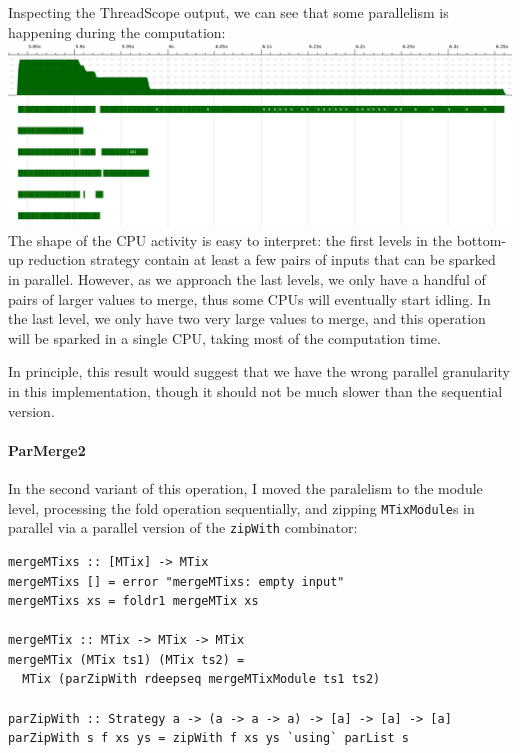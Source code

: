 \documentclass[a4paper,10pt]{article}
\begin{document}
Inspecting the ThreadScope output, we can see that some parallelism is happening
during the computation:\\

\includegraphics[scale=0.3]{threadscope/ParMerge1}\\

The shape of the CPU activity is easy to interpret: the first levels in the
bottom-up reduction strategy contain at least a few pairs of inputs that can be
sparked in parallel.
%
However, as we approach the last levels, we only have a handful of pairs of
larger values to merge, thus some CPUs will eventually start idling.
%
In the last level, we only have two very large values to merge, and this
operation will be sparked in a single CPU, taking most of the computation time.

In principle, this result would suggest that we have the wrong parallel
granularity in this implementation, though it should not be much slower than
the sequential version.

\paragraph{ParMerge2}

In the second variant of this operation, I moved the paralelism to the module
level, processing the fold operation sequentially, and zipping
\texttt{MTixModule}s in parallel via a parallel version of the \texttt{zipWith}
combinator:

\begin{verbatim}
mergeMTixs :: [MTix] -> MTix
mergeMTixs [] = error "mergeMTixs: empty input"
mergeMTixs xs = foldr1 mergeMTix xs

mergeMTix :: MTix -> MTix -> MTix
mergeMTix (MTix ts1) (MTix ts2) =
  MTix (parZipWith rdeepseq mergeMTixModule ts1 ts2)

parZipWith :: Strategy a -> (a -> a -> a) -> [a] -> [a] -> [a]
parZipWith s f xs ys = zipWith f xs ys `using` parList s
\end{verbatim}
\end{document}
